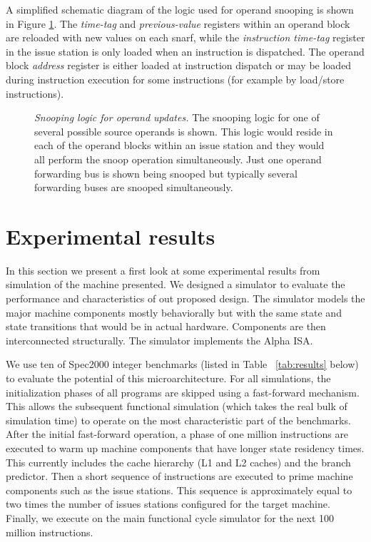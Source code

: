 \documentclass[10pt,twocolumn,dvips]{article}
\begin{document}
A simplified schematic diagram of the logic used for operand snooping
is shown in Figure \ref{fig:source}.
The {\em time-tag} and
{\em previous-value} registers within an operand block
are reloaded with new values on each snarf,
while the
{\em instruction time-tag} register in the issue station
is only loaded when an instruction is dispatched.
The operand block {\em address} register is either loaded at instruction
dispatch or may be loaded during instruction execution for some
instructions
(for example by load/store instructions).
%
\begin{figure}
\caption{{\em Snooping logic for operand updates.} 
\small{
The snooping
logic for one of several possible source operands is shown.
This logic would reside in each of the operand blocks within an 
issue station and they would all perform the snoop operation
simultaneously.
Just one operand forwarding bus is shown being snooped but
typically several forwarding buses are snooped simultaneously.
}
}
\label{fig:source}
\end{figure}
%
%
\vspace{-0.15in}
\section{Experimental results}
%
In this section we present a first look at some
experimental results from simulation
of the machine presented.
We designed a simulator to evaluate the performance
and characteristics of out proposed design.
The simulator models the major machine components mostly behaviorally
but with the same state and state transitions that would be
in actual hardware.  Components are then interconnected 
structurally.  The simulator implements the Alpha ISA.

We use ten of Spec2000 integer benchmarks 
(listed in Table ~\ref{tab:results} below) to evaluate the potential
of this microarchitecture. 
For all simulations, the initialization phases of all
programs are skipped using a fast-forward mechanism.
This allows the subsequent functional simulation (which takes
the real bulk of simulation time) to operate on the most
characteristic part of the benchmarks.
After the initial fast-forward operation, a phase of one million 
instructions are executed to warm up machine components that have longer
state residency times.  This currently includes the cache hierarchy
(L1 and L2 caches) and the branch predictor.
Then a short sequence of instructions are 
executed to prime machine components such as the issue stations.
This sequence is approximately equal to two times the number
of issues stations configured for the target machine.
Finally, we execute on the main functional cycle simulator
for the next 100 million instructions.  
\end{document}

